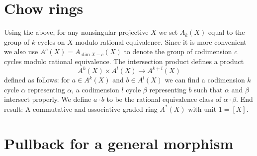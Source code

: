 \section{Chow rings}
\label{section-chow-rings}

\noindent
Using the above, for any nonsingular
projective $X$ we set $A_k(X)$ equal to the group of $k$-cycles
on $X$ modulo rational equivalence. Since it is more convenient
we also use $A^c(X)=A_{\dim X -c}(X)$ to denote the group of
codimension $c$ cycles modulo rational equivalence. The intersection product
defines a product
$$
A^k(X) \times A^l(X) \longrightarrow A^{k+l}(X)
$$
defined as follows: for $a \in A^k(X)$ and $b \in A^l(X)$
we can find a codimension $k$ cycle $\alpha$ representing $\alpha$,
a codimension $l$ cycle $\beta$ representing $b$ such that $\alpha$
and $\beta$ intersect properly.
We define $a\cdot b$ to be the rational equivalence
class of $\alpha \cdot \beta$. End result: A commutative and associative
graded ring $A^*(X)$ with unit $1=[X]$.


\section{Pullback for a general morphism}
\label{section-general-pullback}

